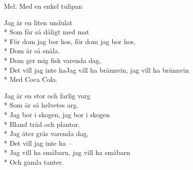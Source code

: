 \begin{SongText}[Undulaten]
    \begin{SongInfo}
        Mel: Med en enkel tulipan
    \end{SongInfo}
    \begin{SongVerse}
        Jag är en liten undulat\\*%
        Som får så dåligt med mat\\*%
        För dom jag bor hos, för dom jag bor hos,\\*%
        Dom är så snåla.\\*%
        Dom ger mig fisk varenda dag,\\*%
        Det vill jag inte haJag vill ha brännvin, 
        jag vill ha brännvin\\*%
        Med Coca Cola.
    \end{SongVerse}
    \begin{SongVerse}
        Jag är en stor och farlig varg\\*%
        Som är så helvetes arg.\\*%
        Jag bor i skogen, jag bor i skogen\\*%
        Bland träd och plantor.\\*%
        Jag äter gräs varenda dag,\\*%
        Det vill jag inte ha –\\*%
        Jag vill ha småbarn, jag vill ha småbarn\\*%
        Och gamla tanter.
    \end{SongVerse}
\end{SongText}
